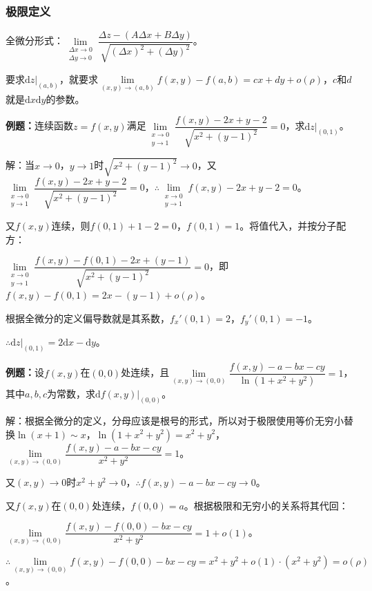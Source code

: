 \documentclass[UTF8, 12pt]{ctexart}
\begin{document}
\subsubsection{极限定义}

全微分形式：$\lim\limits_{\substack{\Delta x\to0\\\Delta y\to0}}\dfrac{\Delta z-(A\Delta x+B\Delta y)}{\sqrt{(\Delta x)^2+(\Delta y)^2}}$。

要求$\textrm{d}z|_{(a,b)}$，就要求$\lim\limits_{(x,y)\to(a,b)}f(x,y)-f(a,b)=cx+dy+o(\rho)$，$c$和$d$就是$\textrm{d}x\textrm{d}y$的参数。

\textbf{例题：}连续函数$z=f(x,y)$满足$\lim\limits_{\substack{x\to0\\ y\to1}}\dfrac{f(x,y)-2x+y-2}{\sqrt{x^2+(y-1)^2}}=0$，求$\textrm{d}z|_{(0,1)}$。

解：当$x\to0$，$y\to1$时$\sqrt{x^2+(y-1)^2}\to0$，又$\lim\limits_{\substack{x\to0\\ y\to1}}\dfrac{f(x,y)-2x+y-2}{\sqrt{x^2+(y-1)^2}}=0$，$\therefore\lim\limits_{\substack{x\to0\\ y\to1}}f(x,y)-2x+y-2=0$。

又$f(x,y)$连续，则$f(0,1)+1-2=0$，$f(0,1)=1$。将值代入，并按分子配方：

$\lim\limits_{\substack{x\to0\\ y\to1}}\dfrac{f(x,y)-f(0,1)-2x+(y-1)}{\sqrt{x^2+(y-1)^2}}=0$，即$f(x,y)-f(0,1)=2x-(y-1)+o(\rho)$。

根据全微分的定义偏导数就是其系数，$f_x'(0,1)=2$，$f_y'(0,1)=-1$。

$\therefore\textrm{d}z|_{(0,1)}=2\textrm{d}x-\textrm{d}y$。

\textbf{例题：}设$f(x,y)$在$(0,0)$处连续，且$\lim\limits_{(x,y)\to(0,0)}\dfrac{f(x,y)-a-bx-cy}{\ln(1+x^2+y^2)}=1$，其中$a,b,c$为常数，求$\textrm{d}f(x,y)|_{(0,0)}$。

解：根据全微分的定义，分母应该是根号的形式，所以对于极限使用等价无穷小替换$\ln(x+1)\sim x$，$\ln(1+x^2+y^2)=x^2+y^2$，$\lim\limits_{(x,y)\to(0,0)}\dfrac{f(x,y)-a-bx-cy}{x^2+y^2}=1$。

又$(x,y)\to0$时$x^2+y^2\to0$，$\therefore f(x,y)-a-bx-cy\to0$。

又$f(x,y)$在$(0,0)$处连续，$f(0,0)=a$。根据极限和无穷小的关系将其代回：

$\lim\limits_{(x,y)\to(0,0)}\dfrac{f(x,y)-f(0,0)-bx-cy}{x^2+y^2}=1+o(1)$。

$\therefore\lim\limits_{(x,y)\to(0,0)}f(x,y)-f(0,0)-bx-cy=x^2+y^2+o(1)\cdot(x^2+y^2)=o(\rho)$。
\end{document}

